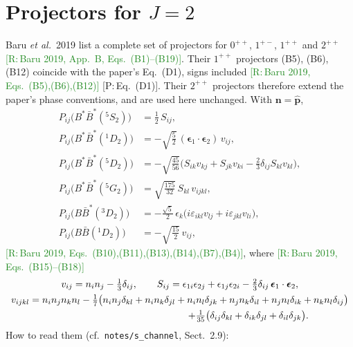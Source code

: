 \documentclass[11pt,a4paper]{article}
\newcommand{\tagP}[1]{\textcolor{blue!65!black}{\textsf{\small[P:\,#1]}}}
\newcommand{\tagR}[1]{\textcolor{ForestGreen}{\textsf{\small[R:\,#1]}}}
\newcommand{\BB}{B\bar B}
\newcommand{\BBst}{B\bar B^*}
\newcommand{\BstBst}{B^*\bar B^*}
\newcommand{\vn}{\bm n}
\newcommand{\veps}{\bm\epsilon}
\begin{document}
\section{Projectors for $J=2$}
\label{sec:proj}

Baru \emph{et al.}\ 2019 list a complete set of projectors for $0^{++}$, $1^{+-}$, $1^{++}$ and $2^{++}$ \tagR{Baru 2019, App.~B, Eqs.~(B1)--(B19)}. Their $1^{++}$ projectors (B5), (B6), (B12) coincide with the paper's Eq.~(D1), signs included \tagR{Baru 2019, Eqs.~(B5),(B6),(B12)} \tagP{Eq.~(D1)}. Their $2^{++}$ projectors therefore extend the paper's phase conventions, and are used here unchanged. With $\vn=\hat{\bm p}$,
\begin{align}
P_{ij}\big(\BstBst(^5S_2)\big)&=\tfrac12\,S_{ij},\label{eq:P1}\\
P_{ij}\big(\BstBst(^1D_2)\big)&=-\sqrt{\tfrac52}\,(\veps_1\cdot\veps_2)\,v_{ij},\\
P_{ij}\big(\BstBst(^5D_2)\big)&=-\sqrt{\tfrac{45}{56}}\Big(S_{ik}v_{kj}+S_{jk}v_{ki}-\tfrac23\delta_{ij}S_{kl}v_{kl}\Big),\\
P_{ij}\big(\BstBst(^5G_2)\big)&=\sqrt{\tfrac{175}{32}}\,S_{kl}\,v_{ijkl},\\
P_{ij}\big(\BBst(^3D_2)\big)&=-\tfrac{\sqrt5}{2}\,\epsilon_k\big(i\varepsilon_{ikl}v_{lj}+i\varepsilon_{jkl}v_{li}\big),\\
P_{ij}\big(\BB(^1D_2)\big)&=-\sqrt{\tfrac{15}{2}}\,v_{ij},\label{eq:P6}
\end{align}
\tagR{Baru 2019, Eqs.~(B10),(B11),(B13),(B14),(B7),(B4)}, where \tagR{Baru 2019, Eqs.~(B15)--(B18)}
\begin{gather}
v_{ij}=n_in_j-\tfrac13\delta_{ij},\qquad
S_{ij}=\epsilon_{1i}\epsilon_{2j}+\epsilon_{1j}\epsilon_{2i}-\tfrac23\delta_{ij}\,\veps_1\cdot\veps_2,\notag\\
v_{ijkl}=n_in_jn_kn_l-\tfrac17\big(n_in_j\delta_{kl}+n_in_k\delta_{jl}+n_in_l\delta_{jk}+n_jn_k\delta_{il}+n_jn_l\delta_{ik}+n_kn_l\delta_{ij}\big)\notag\\
\hspace*{5cm}+\tfrac1{35}\big(\delta_{ij}\delta_{kl}+\delta_{ik}\delta_{jl}+\delta_{il}\delta_{jk}\big).
\end{gather}
How to read them (cf.\ \texttt{notes/s\_channel}, Sect.~2.9):
\end{document}

